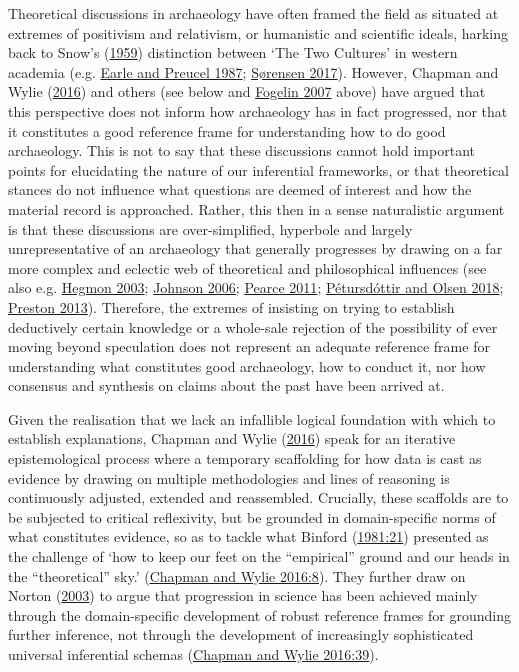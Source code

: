 \documentclass[
  12pt,
  a4paper,
  oneside]{book}
\begin{document}
Theoretical discussions in archaeology have often framed the field as situated at extremes of positivism and relativism, or humanistic and scientific ideals, harking back to Snow's (\protect\hyperlink{ref-snow1959}{1959}) distinction between `The Two Cultures' in western academia (e.g. \protect\hyperlink{ref-earle1987}{Earle and Preucel 1987}; \protect\hyperlink{ref-suxf8rensen2017}{Sørensen 2017}). However, Chapman and Wylie (\protect\hyperlink{ref-chapman2016}{2016}) and others (see below and \protect\hyperlink{ref-fogelin2007}{Fogelin 2007} above) have argued that this perspective does not inform how archaeology has in fact progressed, nor that it constitutes a good reference frame for understanding how to do good archaeology. This is not to say that these discussions cannot hold important points for elucidating the nature of our inferential frameworks, or that theoretical stances do not influence what questions are deemed of interest and how the material record is approached. Rather, this then in a sense naturalistic argument is that these discussions are over-simplified, hyperbole and largely unrepresentative of an archaeology that generally progresses by drawing on a far more complex and eclectic web of theoretical and philosophical influences (see also e.g. \protect\hyperlink{ref-hegmon2003}{Hegmon 2003}; \protect\hyperlink{ref-johnson2006}{Johnson 2006}; \protect\hyperlink{ref-pearce2011}{Pearce 2011}; \protect\hyperlink{ref-petursdottir2018}{Pétursdóttir and Olsen 2018}; \protect\hyperlink{ref-preston2013}{Preston 2013}). Therefore, the extremes of insisting on trying to establish deductively certain knowledge or a whole-sale rejection of the possibility of ever moving beyond speculation does not represent an adequate reference frame for understanding what constitutes good archaeology, how to conduct it, nor how consensus and synthesis on claims about the past have been arrived at.

Given the realisation that we lack an infallible logical foundation with which to establish explanations, Chapman and Wylie (\protect\hyperlink{ref-chapman2016}{2016}) speak for an iterative epistemological process where a temporary scaffolding for how data is cast as evidence by drawing on multiple methodologies and lines of reasoning is continuously adjusted, extended and reassembled. Crucially, these scaffolds are to be subjected to critical reflexivity, but be grounded in domain-specific norms of what constitutes evidence, so as to tackle what Binford (\protect\hyperlink{ref-binford1981}{1981:21}) presented as the challenge of `how to keep our feet on the ``empirical'' ground and our heads in the ``theoretical'' sky.' (\protect\hyperlink{ref-chapman2016}{Chapman and Wylie 2016:8}). They further draw on Norton (\protect\hyperlink{ref-norton2003}{2003}) to argue that progression in science has been achieved mainly through the domain-specific development of robust reference frames for grounding further inference, not through the development of increasingly sophisticated universal inferential schemas (\protect\hyperlink{ref-chapman2016}{Chapman and Wylie 2016:39}).
\end{document}
